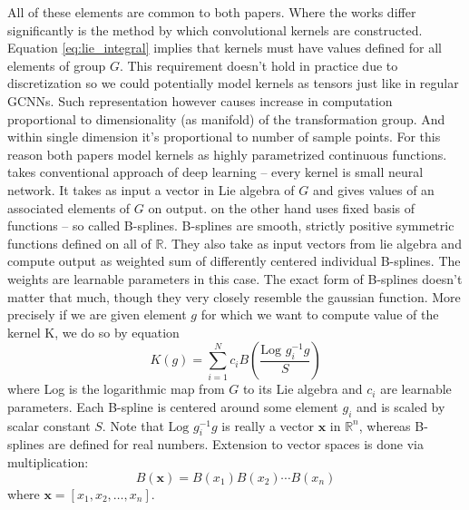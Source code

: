     All of these elements are common to both papers. Where the works
    differ significantly is
    the method by which convolutional kernels are constructed. Equation
    \ref{eq:lie_integral} implies that kernels must have values defined for all
    elements of group $G$. This requirement doesn't hold in practice
    due to discretization so we could potentially model kernels as tensors just
    like in
    regular GCNNs. Such representation however causes increase
    in computation proportional to dimensionality (as manifold) of the
    transformation group. And within single dimension it's proportional to
    number of sample points. For this reason both papers model kernels as highly
    parametrized continuous functions. \cite{lieconv} takes conventional
    approach of deep learning -- every kernel is small neural network. It takes
    as input a vector in Lie algebra of $G$ and gives values of an associated
    elements of $G$ on output. \cite{bekkers2019} on the other hand uses fixed
    basis of functions -- so called B-splines. B-splines are smooth, strictly positive
    symmetric functions defined on all of $\mathbb{R}$. They also take as input
    vectors from lie algebra and compute output as weighted sum of differently
    centered individual B-splines. The weights are learnable parameters in this
    case. The exact form of B-splines doesn't matter that much, though they very
    closely resemble the gaussian function. More precisely if we are given
    element $g$ for which we want to compute value of the kernel K, we do so by
    equation
    \begin{equation}
        K(g) = \sum_{i=1}^N
        c_i B\left(\frac{\text{Log } g_i^{-1}g}{S}\right)
        \label{eq:bsplines}
    \end{equation}
    where Log is the logarithmic map from $G$ to its Lie algebra and $c_i$ are
    learnable parameters. Each B-spline is
    centered around some element $g_i$ and is scaled by scalar constant $S$. Note that
    $\text{Log } g_i^{-1}g$ is really a vector $\mathbf{x}$ in $\mathbb{R}^n$,
    whereas B-splines are defined for real numbers. Extension to vector spaces
    is done via multiplication:
    \begin{equation}
        B(\mathbf{x}) = B(x_1)B(x_2)\cdots B(x_n)
    \end{equation}
    where $\mathbf{x} = \left[x_1,x_2,\dots,x_n\right]$.












